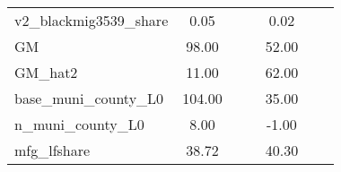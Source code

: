 \begin{table}[htbp]
\begin{tabular}{l*{2}{ccc}}
v2\_blackmig3539\_share&        0.05&            &            &        0.02&            &            \\
GM                  &       98.00&            &            &       52.00&            &            \\
GM\_hat2             &       11.00&            &            &       62.00&            &            \\
base\_muni\_county\_L0 &      104.00&            &            &       35.00&            &            \\
n\_muni\_county\_L0    &        8.00&            &            &       -1.00&            &            \\
mfg\_lfshare         &       38.72&            &            &       40.30&            &            \\
\bottomrule
\end{tabular}
\end{table}
